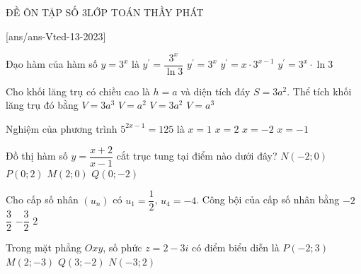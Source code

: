 \begin{name}
	{\tenchude}{ĐỀ ÔN TẬP SỐ 3}{LỚP TOÁN THẦY PHÁT}{\thoigian}
\end{name}
\setcounter{ex}{0}
\setcounter{bt}{0}
[ans/ans-Vted-13-2023]
\begin{ex}%
	Đạo hàm của hàm số $y=3^x$ là
	\choice 
	{$y^{\prime}=\dfrac{3^x}{\ln 3}$}
	{$y^{\prime}=3^x$}
	{$y^{\prime}=x\cdot 3^{x-1}$}
	{\True $y^{\prime}=3^x\cdot \ln 3$}
\end{ex}	
\begin{ex}%
	Cho khối lăng trụ có chiều cao là $h=a$ và diện tích đáy $S=3a^2$. Thể tích khối lăng trụ đó bằng
	\choice 
	{\True $V=3a^3$}
	{$V=a^2$}
	{$V=3a^2$}
	{$V=a^3$}
\end{ex}
\begin{ex}%
	Nghiệm của phương trình $5^{2x-1}=125$ là
	\choice 
	{$x=1$}
	{\True $x=2$}
	{$x=-2$}
	{$x=-1$}
\end{ex}
\begin{ex}%
	Đồ thị hàm số $y=\dfrac{x+2}{x-1}$ cắt trục tung tại điểm nào dưới đây?
	\choice 
	{$N(-2;0)$}
	{$P(0;2)$}
	{$M(2;0)$}
	{\True $Q(0;-2)$}
\end{ex}
\begin{ex}%
	Cho cấp số nhân $(u_n)$ có $u_1=\dfrac{1}{2}$, $u_4=-4$. Công bội của cấp số nhân bằng
	\choice 
	{\True $-2$}
	{$\dfrac{3}{2}$}
	{$-\dfrac{3}{2}$}
	{$2$}
\end{ex}
\begin{ex}%
	Trong mặt phẳng $Oxy$, số phức $z=2-3i$ có điểm biểu diễn là
	\choice 
	{$P(-2;3)$}
	{\True $M(2;-3)$}
	{$Q(3;-2)$}
	{$N(-3;2)$}
\end{ex}
